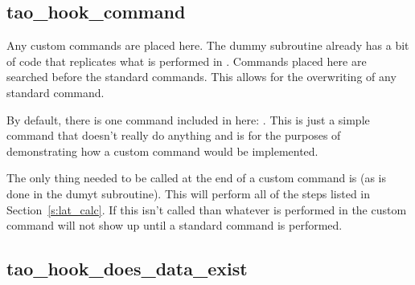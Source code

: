 \subsection{tao\_hook\_command}

Any custom commands are placed here. The dummy subroutine already has
a bit of code that replicates what is performed in
. Commands placed here are searched before the
standard \tao commands. This allows for the overwriting of any
standard \tao command.

By default, there is one command included in here: . This
is just a simple command that doesn't really do anything and is for
the purposes of demonstrating how a custom command would be
implemented.

The only thing needed to be called at the end of a custom command is
 (as is done in the dumyt subroutine). This will
perform all of the steps listed in Section~\ref{s:lat_calc}. If this
isn't called than whatever is performed in the custom command will not
show up until a standard command is performed.

\subsection{tao\_hook\_does\_data\_exist}

